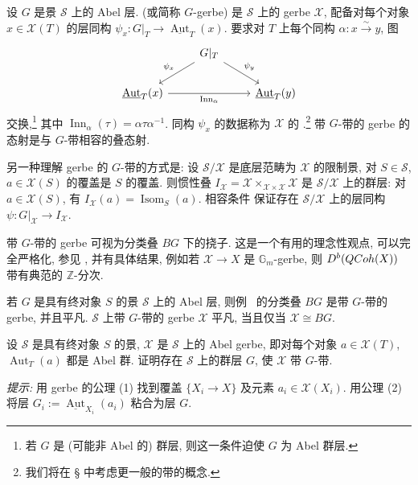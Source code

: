 \begin{definition}\label{src:7.4.10}
设 $G$ 是景 $\mathcal S$ 上的 Abel 层.  (或简称 $G$-gerbe) 是 $\mathcal S$ 上的 gerbe $\mathcal X$, 配备对每个对象 $x\in\mathcal X(T)$ 的层同构 $\psi_x:G|_T\to\underline{\operatorname{Aut}}_T(x)$. 要求对 $T$ 上每个同构 $\alpha:x\xrightarrow{\sim}y$, 图
\begin{equation}\label{src:7.4.11}
\begin{tikzcd}[ampersand replacement=\&]
\&G|_T\arrow[dl,"{\psi_x}"']\arrow[dr,"{\psi_y}"]\&\\
\underline{\operatorname{Aut}}_T(x)\arrow[rr,"{\operatorname{Inn}_\alpha}"']\&\&\underline{\operatorname{Aut}}_T(y)
\end{tikzcd}
\end{equation}
交换,\footnote{若 $G$ 是 (可能非 Abel 的) 群层, 则这一条件迫使 $G$ 为 Abel 群层.} 其中 $\operatorname{Inn}_\alpha(\tau)=\alpha\tau\alpha^{-1}$. 同构 $\psi_x$ 的数据称为 $\mathcal X$ 的 .\footnote{我们将在 \S{} 中考虑更一般的带的概念.} 带 $G$-带的 gerbe 的态射是与 $G$-带相容的叠态射.
\end{definition}
\begin{remark}\label{src:7.4.12}
另一种理解 gerbe 的 $G$-带的方式是: 设 $\mathcal S/\mathcal X$ 是底层范畴为 $\mathcal X$ 的限制景, 对 $S\in\mathcal S$, $a\in\mathcal X(S)$ 的覆盖是 $S$ 的覆盖. 则惯性叠 $I_{\mathcal X}=\mathcal X\times_{\mathcal X\times\mathcal X}\mathcal X$ 是 $\mathcal S/\mathcal X$ 上的群层: 对 $a\in\mathcal X(S)$, 有 $I_{\mathcal X}(a)=\operatorname{Isom}_S(a)$. 相容条件  保证存在 $\mathcal S/\mathcal X$ 上的层同构 $\psi:G|_{\mathcal X}\to I_{\mathcal X}$.
\end{remark}
\begin{remark}\label{src:7.4.13}
带 $G$-带的 gerbe 可视为分类叠 $BG$ 下的挠子. 这是一个有用的理念性观点, 可以完全严格化, 参见 \cite[\S A.5]{CZ17}, 并有具体结果, 例如若 $\mathcal X\to X$ 是 $\mathbb G_m$-gerbe, 则 $D^b(QCoh(X))$ 带有典范的 $\mathbb Z$-分次.
\end{remark}
\begin{example}\label{src:7.4.14}
若 $G$ 是具有终对象 $S$ 的景 $\mathcal S$ 上的 Abel 层, 则例~ 的分类叠 $BG$ 是带 $G$-带的 gerbe, 并且平凡. $\mathcal S$ 上带 $G$-带的 gerbe $\mathcal X$ 平凡, 当且仅当 $\mathcal X\cong BG$.
\end{example}
\begin{exercise}\label{src:7.4.15}
设 $\mathcal S$ 是具有终对象 $S$ 的景, $\mathcal X$ 是 $\mathcal S$ 上的 Abel gerbe, 即对每个对象 $a\in\mathcal X(T)$, $\operatorname{Aut}_T(a)$ 都是 Abel 群. 证明存在 $\mathcal S$ 上的群层 $G$, 使 $\mathcal X$ 带 $G$-带.

\textit{提示:} 用 gerbe 的公理 (1) 找到覆盖 $\{X_i\to X\}$ 及元素 $a_i\in\mathcal X(X_i)$. 用公理 (2) 将层 $G_i:=\underline{\operatorname{Aut}}_{X_i}(a_i)$ 粘合为层 $G$.
\end{exercise}
